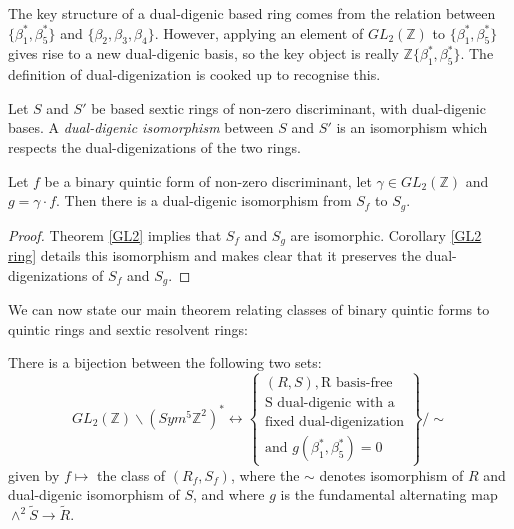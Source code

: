 \documentclass{report}
\begin{document}
The key structure of a dual-digenic based ring comes from the relation between $\{ \beta_1^*, \beta_5^* \}$ and $\{ \beta_2, \beta_3, \beta_4 \}$.  However, applying an element of $GL_2(\mathbb{Z})$ to $\{ \beta_1^*, \beta_5^* \}$ gives rise to a new dual-digenic basis, so the key object is really $\mathbb{Z} \{ \beta_1^*, \beta_5^* \}$.  The definition of dual-digenization is cooked up to recognise this.

\begin{definition}
Let $S$ and $S'$ be based sextic rings of non-zero discriminant, with dual-digenic bases.  A \emph{dual-digenic isomorphism} between $S$ and $S'$ is an isomorphism which respects the dual-digenizations of the two rings.
\end{definition}

\begin{corollary} \label{GL2 dual digenic}
Let $f$ be a binary quintic form of non-zero discriminant, let $\gamma \in GL_2(\mathbb{Z})$ and $g = \gamma \cdot f$.  Then 
there is a dual-digenic isomorphism from $S_f$ to $S_g$.
\end{corollary}
\begin{proof}
Theorem \ref{GL2} implies that $S_f$ and $S_g$ are isomorphic.  Corollary \ref{GL2 ring} details this isomorphism and makes clear that it preserves the dual-digenizations of $S_f$ and $S_g$.
\end{proof}

We can now state our main theorem relating classes of binary quintic forms to quintic rings and sextic resolvent rings:
\begin{theorem} \label{main class theorem}
There is a bijection between the following two sets:
\begin{equation}
GL_2(\mathbb{Z}) \backslash (Sym^5 \mathbb{Z}^2)^* \leftrightarrow
\left \{
\begin{array}{l}
(R,S), \text{R basis-free} \\
\text{S dual-digenic with a} \\
\text{fixed dual-digenization} \\
\text{and } g(\beta_1^*,\beta_5^*) = 0 
\end{array}
\right \}
 / \sim
\end{equation}
given by $f \mapsto$ the class of $(R_f, S_f)$, where the $\sim$ denotes isomorphism of $R$ and dual-digenic isomorphism of $S$, and where $g$ is the fundamental alternating map $\wedge^2 \tilde{S} \to \tilde{R}$.
\end{theorem}
\end{document}
